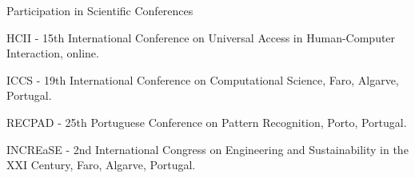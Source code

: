 \begin{rubric}{Participation in Scientific Conferences}

  \entry*[\texttt{2021 ~}]
  \par HCII - 15th International Conference on Universal Access in Human-Computer Interaction, online.
  \vspace{0.05cm}
  \entry*[\texttt{2020 ~}]
  \par ICCS - 19th International Conference on Computational Science, Faro, Algarve, Portugal.
  \vspace{0.05cm}
  \entry*[\texttt{2019 ~}]
  \par RECPAD - 25th Portuguese Conference on Pattern Recognition, Porto, Portugal.
  \vspace{0.05cm}
  \entry*[ \texttt{2019 ~}]
  \par INCREaSE - 2nd International Congress on Engineering and Sustainability in the XXI Century,
  Faro, Algarve, Portugal.
  \vspace{0.05cm}

\end{rubric}